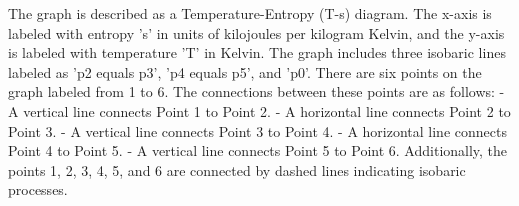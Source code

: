 The graph is described as a Temperature-Entropy (T-s) diagram. The x-axis is labeled with entropy 's' in units of kilojoules per kilogram Kelvin, and the y-axis is labeled with temperature 'T' in Kelvin. The graph includes three isobaric lines labeled as 'p2 equals p3', 'p4 equals p5', and 'p0'. There are six points on the graph labeled from 1 to 6. The connections between these points are as follows:
- A vertical line connects Point 1 to Point 2.
- A horizontal line connects Point 2 to Point 3.
- A vertical line connects Point 3 to Point 4.
- A horizontal line connects Point 4 to Point 5.
- A vertical line connects Point 5 to Point 6.
Additionally, the points 1, 2, 3, 4, 5, and 6 are connected by dashed lines indicating isobaric processes.